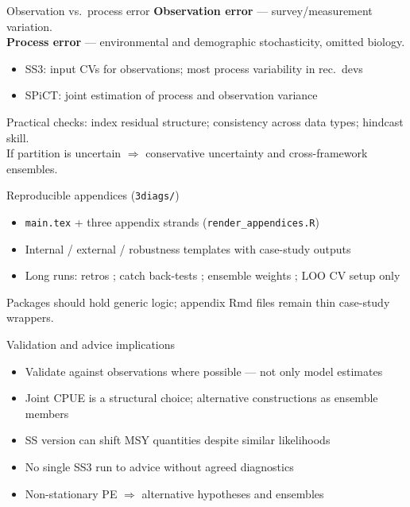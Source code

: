 \documentclass[ignorenonframetext]{beamer}
\begin{document}
\begin{frame}{Observation vs.\ process error}
  \small
  \textbf{Observation error} --- survey/measurement variation.\\
  \textbf{Process error} --- environmental and demographic stochasticity, omitted biology.
  \vspace{0.3em}
  \begin{itemize}
    \item SS3: input CVs for observations; most process variability in rec.\ devs
    \item SPiCT: joint estimation of process and observation variance
  \end{itemize}
  \vspace{0.3em}
  Practical checks: index residual structure; consistency across data types; hindcast skill.\\
  If partition is uncertain $\Rightarrow$ conservative uncertainty and cross-framework ensembles.
\end{frame}

\begin{frame}{Reproducible appendices (\texttt{3diags/})}
  \small
  \begin{itemize}
    \item \texttt{main.tex} + three appendix strands (\texttt{render\_appendices.R})
    \item Internal / external / robustness templates with case-study outputs
    \item Long runs: retros \checkmark; catch back-tests \checkmark; ensemble weights \checkmark; LOO CV setup only
  \end{itemize}
  \vspace{0.4em}
  Packages should hold generic logic; appendix Rmd files remain thin case-study wrappers.
\end{frame}

\begin{frame}{Validation and advice implications}
  \small
  \begin{itemize}
    \item Validate against observations where possible --- not only model estimates
    \item Joint CPUE is a structural choice; alternative constructions as ensemble members
    \item SS version can shift MSY quantities despite similar likelihoods
    \item No single SS3 run to advice without agreed diagnostics
    \item Non-stationary PE $\Rightarrow$ alternative hypotheses and ensembles
  \end{itemize}
\end{frame}
\end{document}
